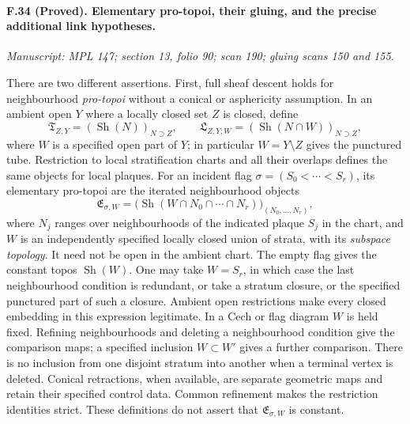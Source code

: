 \paragraph{F.34 (Proved). Elementary pro-topoi, their gluing, and the
precise additional link hypotheses.}
\textit{Manuscript: MPL 147; section 13, folio 90; scan 190; gluing scans 150 and 155.}

There are two different assertions.
First, full sheaf descent holds for neighbourhood \emph{pro-topoi}
without a conical or asphericity assumption. In an ambient open $Y$
where a locally closed set $Z$ is closed, define
\[
 \mathfrak T_{Z,Y}=(\operatorname{Sh}(N))_{N\supset Z},
 \qquad
 \mathfrak L_{Z,Y;W}=(\operatorname{Sh}(N\cap W))_{N\supset Z},
 \tag{F.h.4}
\]
where $W$ is a specified open part of $Y$; in particular
$W=Y\setminus Z$ gives the punctured tube. Restriction to local
stratification charts and all their overlaps defines the same objects
for local plaques. For an incident flag
$\sigma=(S_0<\cdots<S_r)$, its elementary pro-topoi are the iterated
neighbourhood objects
\[
 \mathfrak E_{\sigma,W}
   =\bigl(\operatorname{Sh}
       (W\cap N_0\cap\cdots\cap N_r)\bigr)_{(N_0,\ldots,N_r)},
 \tag{F.h.5}
\]
where $N_j$ ranges over neighbourhoods of the indicated plaque $S_j$
in the chart, and $W$ is an independently specified locally closed
union of strata, with its \emph{subspace topology}. It need not be
open in the ambient chart. The empty flag gives the constant topos
$\operatorname{Sh}(W)$. One may take $W=S_r$, in which case the last
neighbourhood condition is redundant, or take a stratum closure, or
the specified punctured part of such a closure. Ambient open
restrictions make every closed embedding in this expression legitimate.
In a Cech or flag diagram $W$ is held fixed. Refining neighbourhoods
and deleting a neighbourhood condition give the comparison maps;
a specified inclusion $W\subset W'$ gives a further comparison.
There is no inclusion from one disjoint stratum into another when a
terminal vertex is deleted. Conical retractions, when available, are
separate geometric maps and retain their specified control data.
Common refinement makes the restriction identities strict. These
definitions do not assert that
$\mathfrak E_{\sigma,W}$ is constant.


